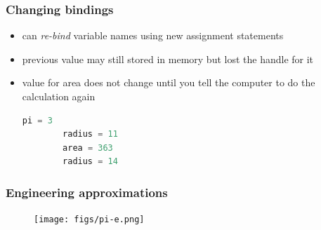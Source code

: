 \documentclass[notes]{beamer}
\begin{document}
\begin{frame}[fragile]
	\frametitle{Changing bindings}
	\begin{itemize}
		\item can \textit{re-bind} variable names using new assignment
		statements
		\item previous value may still stored in memory but lost the
		handle for it
		\item value for area does not change until you tell the computer to do the calculation again
		\begin{lstlisting}[language=Python]
		pi = 3
		radius = 11
		area = 363
		radius = 14
		\end{lstlisting}
	\end{itemize}
\end{frame}

\begin{frame}[fragile]
	\frametitle{Engineering approximations}
	\begin{figure}[ht]
		\centering
		\texttt{[image: figs/pi-e.png]}
	\end{figure}
\end{frame}
\end{document}
